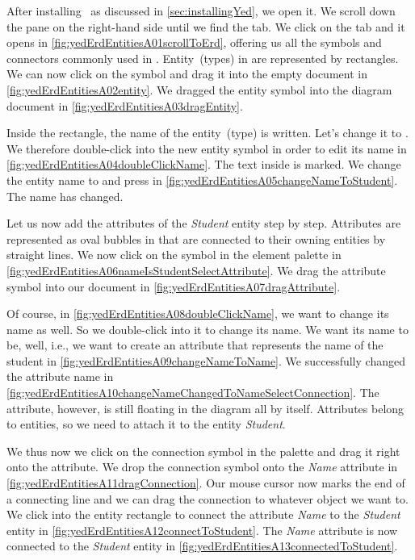 After installing \yEd\ as discussed in \cref{sec:installingYed}, we open it.
We scroll down the  pane on the right-hand side until we find the  tab.
We click on the tab and it opens in \cref{fig:yedErdEntitiesA01scrollToErd}, offering us all the symbols and connectors commonly used in .
Entity~(types) in  are represented by rectangles.
We can now click on the  symbol and drag it into the empty document in \cref{fig:yedErdEntitiesA02entity}.
We dragged the entity symbol into the diagram document in \cref{fig:yedErdEntitiesA03dragEntity}.

Inside the rectangle, the name of the entity~(type) is written.
Let's change it to .
We therefore double-click into the new entity symbol in order to edit its name in \cref{fig:yedErdEntitiesA04doubleClickName}.
The text inside is marked.
We change the entity name to  and press \keys{\enter} in \cref{fig:yedErdEntitiesA05changeNameToStudent}.
The name has changed.

Let us now add the attributes of the \emph{Student} entity step by step.
Attributes are represented as oval bubbles in  that are connected to their owning entities by straight lines.
We now click on the  symbol in the element palette in \cref{fig:yedErdEntitiesA06nameIsStudentSelectAttribute}.
We drag the attribute symbol into our document in \cref{fig:yedErdEntitiesA07dragAttribute}.

Of course, in \cref{fig:yedErdEntitiesA08doubleClickName}, we want to change its name as well.
So we double-click into it to change its name.
We want its name to be, well,  i.e., we want to create an attribute that represents the name of the student in \cref{fig:yedErdEntitiesA09changeNameToName}.
We successfully changed the attribute name in \cref{fig:yedErdEntitiesA10changeNameChangedToNameSelectConnection}.
The attribute, however, is still floating in the diagram all by itself.
Attributes belong to entities, so we need to attach it to the entity \emph{Student}.

We thus now we click on the connection symbol in the palette and drag it right onto the attribute.
We drop the connection symbol onto the \emph{Name} attribute in \cref{fig:yedErdEntitiesA11dragConnection}.
Our mouse cursor now marks the end of a connecting line and we can drag the connection to whatever object we want to.
We click into the entity rectangle to connect the attribute \emph{Name} to the \emph{Student} entity in \cref{fig:yedErdEntitiesA12connectToStudent}.
The \emph{Name} attribute is now connected to the \emph{Student} entity in \cref{fig:yedErdEntitiesA13connectedToStudent}.

